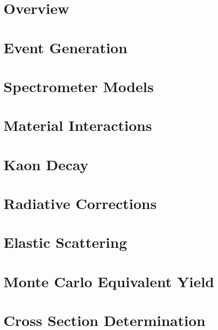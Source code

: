 \documentclass[
]{report}
\begin{document}
\label{Chapter-6}

\hypertarget{Section-6.1}{%
\section{Overview}\label{Section-6.1}}

\hypertarget{Section-6.2}{%
\section{Event Generation}\label{Section-6.2}}

\hypertarget{Section-6.3}{%
\section{Spectrometer Models}\label{Section-6.3}}

\hypertarget{Section-6.4}{%
\section{Material Interactions}\label{Section-6.4}}

\hypertarget{Section-6.5}{%
\section{Kaon Decay}\label{Section-6.5}}

\hypertarget{Section-6.6}{%
\section{Radiative Corrections}\label{Section-6.6}}

\hypertarget{Section-6.7}{%
\section{Elastic Scattering}\label{Section-6.7}}

\label{Chapter-7}

\hypertarget{Section-7.1}{%
\section{Monte Carlo Equivalent Yield}\label{Section-7.1}}

\hypertarget{Section-7.2}{%
\section{Cross Section Determination}\label{Section-7.2}}
\end{document}
